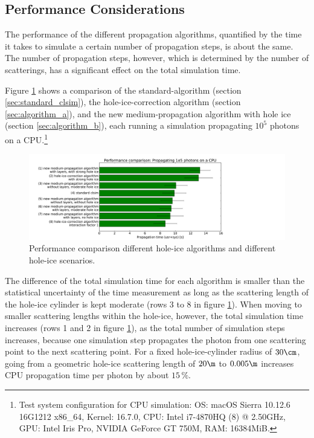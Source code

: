 
\subsection{Performance Considerations}
\label{sec:performance}

The performance of the different propagation algorithms, quantified by the time it takes to simulate a certain number of propagation steps, is about the same. The number of propagation steps, however, which is determined by the number of scatterings, has a significant effect on the total simulation time.

Figure \ref{fig:Go7Maquo} shows a comparison of the standard-\clsim algorithm (section \ref{sec:standard_clsim}), the hole-ice-correction algorithm (section \ref{sec:algorithm_a}), and the new medium-propagation algorithm with hole ice (section \ref{sec:algorithm_b}), each running a simulation propagating $10^5$ photons on a CPU.\footnote{Test system configuration for CPU simulation: OS: macOS Sierra 10.12.6 16G1212 x86\_64, Kernel: 16.7.0, CPU: Intel i7-4870HQ (8) @ 2.50GHz, GPU: Intel Iris Pro, NVIDIA GeForce GT 750M, RAM: 16384MiB.}

\begin{figure}[htbp]
  \includegraphics[width=\textwidth, trim = {1cm 0 10cm 0.7cm}, clip]{img/performance-comparison}
  \caption{Performance comparison different hole-ice algorithms and different hole-ice scenarios.}
  \label{fig:Go7Maquo}
\end{figure}


The difference of the total simulation time for each algorithm is smaller than the statistical uncertainty of the time measurement as long as the scattering length of the hole-ice cylinder is kept moderate (rows 3 to 8 in figure \ref{fig:Go7Maquo}). When moving to smaller scattering lengths within the hole-ice, however, the total simulation time increases (rows 1 and 2 in figure \ref{fig:Go7Maquo}), as the total number of simulation steps increases, because one simulation step propagates the photon from one scattering point to the next scattering point.
For a fixed hole-ice-cylinder radius of $30\cm$, going from a geometric hole-ice scattering length of $20\m$ to $0.005\m$ increases CPU propagation time per photon by about $15\,\%$.

